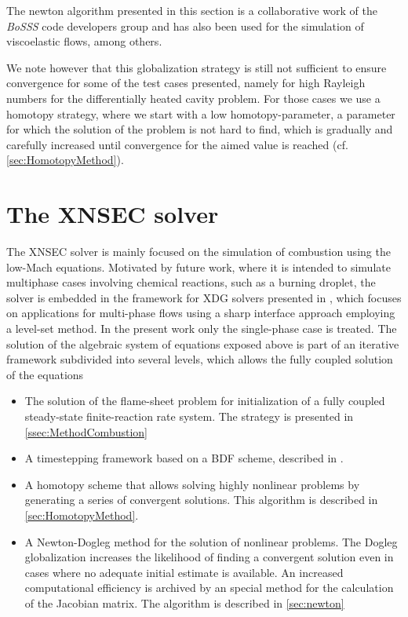 The newton algorithm presented in this section is a collaborative work of the \textit{BoSSS}  code developers group and has also been used for the simulation of viscoelastic \parencite{kikkerFullyCoupledHighorder} flows, among others.


We note however that this globalization strategy is still not sufficient to ensure convergence for some of the test cases presented, namely for high Rayleigh numbers for the differentially heated cavity problem. For those cases we use a homotopy strategy, where we start with a low homotopy-parameter, a parameter for which the solution of the problem is not hard to find, which is gradually and carefully increased until convergence for the aimed value is reached (cf. \cref{sec:HomotopyMethod}).




\section{The XNSEC solver}
The XNSEC solver is mainly focused on the simulation of combustion using the low-Mach equations. Motivated by future work, where it is intended to simulate multiphase cases involving chemical reactions, such as a burning droplet, the solver is embedded in the framework for \gls{XDG} solvers presented in \textcite{kummerExtendedDiscontinuousGalerkin2017}, which focuses on applications for multi-phase flows using a sharp interface approach employing a level-set method.  In the present work only the single-phase case is treated. The solution of the algebraic system of equations exposed above is part of an iterative framework subdivided into several levels, which allows the fully coupled solution of the equations

\begin{itemize}
\item  The solution of the flame-sheet problem for initialization of a fully coupled steady-state finite-reaction rate system. The strategy is presented in \cref{ssec:MethodCombustion}
\item A timestepping framework based on a \gls{BDF} scheme, described in \textcite{kummer2018}.
\item A homotopy scheme that allows solving highly nonlinear problems by generating a series of convergent solutions. This algorithm is described in \cref{sec:HomotopyMethod}.
\item A Newton-Dogleg method for the solution of nonlinear problems. The Dogleg globalization increases the likelihood of finding a convergent solution even in cases where no adequate initial estimate is available. An increased computational efficiency is archived by an special method for the calculation of the Jacobian matrix. The algorithm is described in \cref{sec:newton}
\end{itemize}

